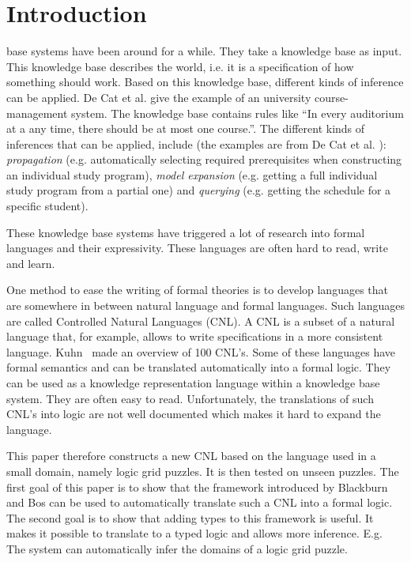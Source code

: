 \section{Introduction}

 base systems have been around for a while. They take a knowledge base as input. This knowledge base describes the world, i.e. it is a specification of how something should work. Based on this knowledge base, different kinds of inference can be applied. De Cat et al. \cite{IDP} give the example of an university course-management system. The knowledge base contains rules like ``In every auditorium at a any time, there should be at most one course.''. The different kinds of inferences that can be applied, include (the examples are from De Cat et al. \cite{IDP}): \textit{propagation} (e.g. automatically selecting required prerequisites when constructing an individual study program), \textit{model expansion} (e.g. getting a full individual study program from a partial one) and \textit{querying} (e.g. getting the schedule for a specific student).

These knowledge base systems have triggered a lot of research into formal languages and their expressivity. These languages are often hard to read, write and learn.

One method to ease the writing of formal theories is to develop languages that are somewhere in between natural language and formal languages. Such languages are called Controlled Natural Languages (CNL). A CNL is a subset of a natural language that, for example, allows to write specifications in a more consistent language. Kuhn~\cite{Kuhn2014} made an overview of 100 CNL's. Some of these languages have formal semantics and can be translated automatically into a formal logic. They can be used as a knowledge representation language within a knowledge base system. They are often easy to read. Unfortunately, the translations of such CNL's into logic are not well documented which makes it hard to expand the language.

This paper therefore constructs a new CNL based on the language used in a small domain, namely logic grid puzzles. It is then tested on unseen puzzles. The first goal of this paper is to show that the framework introduced by Blackburn and Bos \cite{Blackburn2005, Blackburn2006} can be used to automatically translate such a CNL into a formal logic. The second goal is to show that adding types to this framework is useful. It makes it possible to translate to a typed logic and allows more inference. E.g. The system can automatically infer the domains of a logic grid puzzle.

